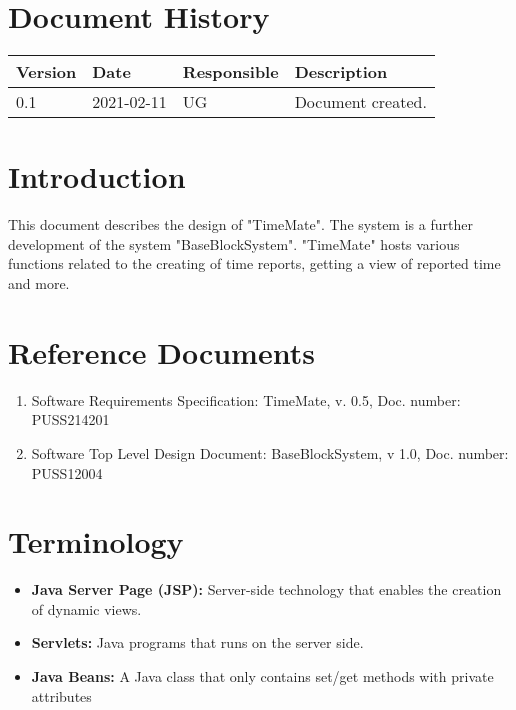 \documentclass{article}
\date {#1}
\title {
    \documentNumber {01}    
    
    \documentVersion {0.1}
    
    \documentTitle {Software Top Level Design Document}
    \documentGroup {2}
    
    \documentResponsible {System Group}
    \documentAuthors {Developer Group}
    
    \documentDate {2021-02-11}
}
\begin{document}
\maketitle
\thispagestyle{empty}

\newpage

\tableofcontents

\newpage


\section{Document History}
\begin{tabular}{ l | l | l | l }
    Version & Date & Responsible & Description \\
    \hline
    0.1 & 2021-02-11 & UG & Document created. \\
\end{tabular}

\section{Introduction}
This document describes the design of "TimeMate". The system is a further development of the system "BaseBlockSystem". "TimeMate" hosts various functions related to the creating of time reports, getting a view of reported time and more.

\section{Reference Documents}
\begin{enumerate}
    \item Software Requirements Specification: TimeMate, v. 0.5, Doc. number: PUSS214201
    \item Software Top Level Design Document: BaseBlockSystem, v 1.0, Doc. number: PUSS12004
\end{enumerate}

\section{Terminology}
\begin{itemize}
\item \textbf{Java Server Page (JSP):} Server-side technology that enables the creation of dynamic views.
\item \textbf{Servlets:} Java programs that runs on the server side.
\item \textbf{Java Beans:} A Java class that only contains set/get methods with private attributes
\end{itemize}
\end{document}
